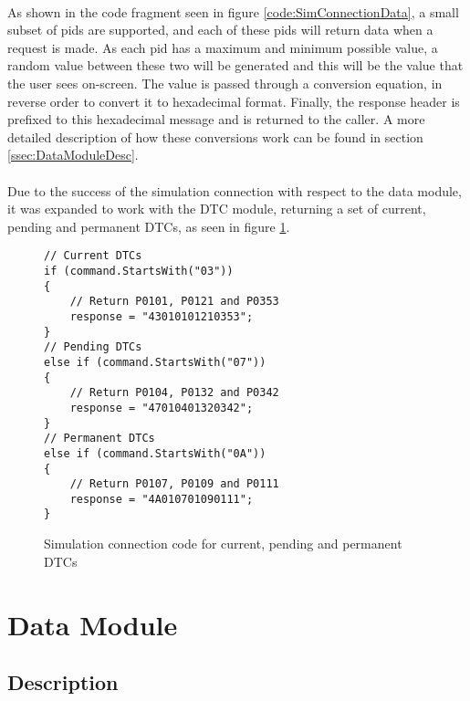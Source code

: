 		\paragraph{}{
		As shown in the code fragment seen  in figure \ref{code:SimConnectionData}, a small subset of pids are supported, and each of these pids will return data when a request is made. As each pid has a maximum and minimum possible value, a random value between these two will be generated and this will be the value that the user sees on-screen. The value  is passed through a conversion equation, in reverse order to convert it to hexadecimal format. Finally, the response header is prefixed to this hexadecimal message and is returned to the caller. A more detailed description of how these conversions work can be found in section \ref{ssec:DataModuleDesc}.
		}
		\paragraph{}{
		Due to the success of the simulation connection with respect to the data module, it was expanded to work with the DTC module, returning a set of current, pending and permanent DTCs, as seen in figure \ref{code:SimConnectionDTC}.
		}
		
		\begin{figure}[h]
			\begin{lstlisting}
// Current DTCs
if (command.StartsWith("03"))
{
	// Return P0101, P0121 and P0353	
	response = "43010101210353";
}
// Pending DTCs
else if (command.StartsWith("07"))
{
	// Return P0104, P0132 and P0342	
	response = "47010401320342";
}
// Permanent DTCs
else if (command.StartsWith("0A"))
{
	// Return P0107, P0109 and P0111	
	response = "4A010701090111";
}			
			\end{lstlisting}
			\caption{Simulation connection code for current, pending and permanent DTCs}
			\label{code:SimConnectionDTC}
		\end{figure}

\section{Data Module}
	\subsection{Description}{		
		\paragraph{}{
		}
		\label{ssec:DataModuleDesc}
	}
